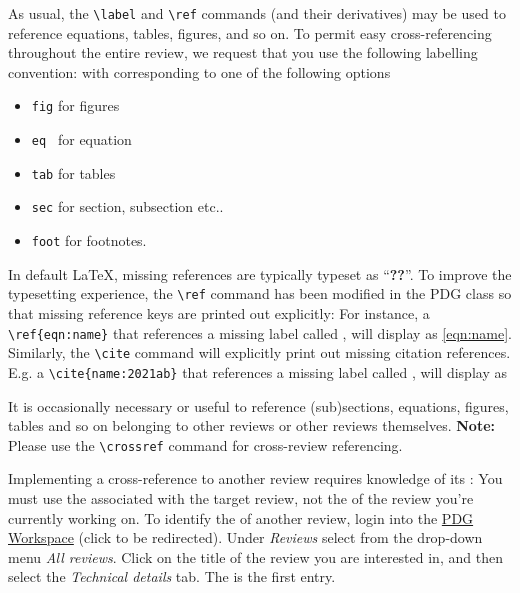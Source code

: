 As usual, the \lstinline{\label} and \lstinline{\ref} commands (and their derivatives) may be used to reference equations, tables, figures, and so on. 
To permit easy cross-referencing throughout the entire review, we request that you use the following labelling convention: 
with  corresponding to one of the following options
\begin{itemize}
\item {\tt fig} for figures
\item {\tt eq } for equation
\item {\tt tab} for tables
\item {\tt sec} for section, subsection etc..
\item {\tt foot} for footnotes.
\end{itemize}


In default LaTeX, missing references are typically typeset as ``\textbf{??}''. 
To improve the typesetting experience, the \lstinline{\ref} command has been modified in the PDG class so that missing reference keys are printed out explicitly: 
For instance, a \lstinline!\ref{eqn:name}! that references a missing label called , will display as \ref{eqn:name}.
Similarly, the \lstinline{\cite} command will explicitly print out missing citation references. E.g. 
a \lstinline!\cite{name:2021ab}! that references a missing label called , will display as \cite{name:2021ab}

It is occasionally necessary or useful to reference (sub)sections, equations, figures, tables and so on belonging to other reviews or other reviews themselves. 
\textbf{Note:} Please use the \lstinline{\crossref} command for cross-review referencing.

Implementing a cross-reference to another review requires knowledge of its  :  
You must use the  associated with the target review, not the  of the review you're currently working on. 
To identify the   of another review, login into the \href{https://pdgworkspace.lbl.gov/Reviews.action}{PDG Workspace} (click to be redirected). 
Under \emph{Reviews} select from the drop-down menu \emph{All reviews}. 
Click on the title of the review you are interested in, and then select the \emph{Technical details} tab. 
The  is the first entry.


